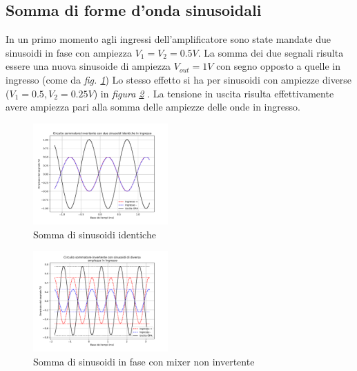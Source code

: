 \documentclass[journal]{IEEEtran}
\begin{document}
\vspace{-10mm}


\subsection{\textbf{Somma di forme d'onda sinusoidali}}
In un primo momento agli ingressi dell'amplificatore sono state mandate due sinusoidi in fase con ampiezza $V_1 = V_2 = 0.5 V$. La somma dei due segnali risulta essere una nuova sinusoide di ampiezza $V_{out} = 1 V$ con segno opposto a quelle in ingresso (come da \textit{fig. \ref{fig:Mixer1}})
Lo stesso effetto si ha per sinusoidi con ampiezze diverse ($V_1 = 0.5, V_2 = 0.25 V$) in \textit{figura \ref{fig:Mixer3} }. La tensione in uscita risulta effettivamente avere ampiezza pari alla somma delle ampiezze delle onde in ingresso.

\begin{figure}[H]%
\begin{center}
\includegraphics[width=0.46\textwidth]{analysis/output/OPA_mixer_sin0.pdf}
\caption{Somma di sinusoidi identiche}
\label{fig:Mixer1}
\end{center}
\end{figure}

\begin{figure}[H]%
\begin{center}
\includegraphics[width=0.46\textwidth]{analysis/output/OPA_mixer_sin3.pdf}
\caption{Somma di sinusoidi in fase con mixer non invertente}
\label{fig:Mixer3}
\end{center}
\end{figure}
\end{document}
